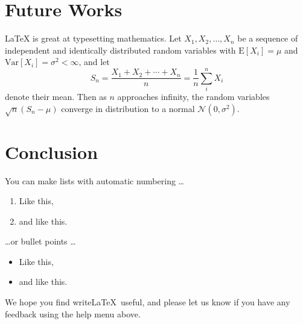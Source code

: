 
\section{Future Works}

\LaTeX{} is great at typesetting mathematics. Let $X_1, X_2, \ldots, X_n$ be a sequence of independent and identically distributed random variables with $\text{E}[X_i] = \mu$ and $\text{Var}[X_i] = \sigma^2 < \infty$, and let
$$S_n = \frac{X_1 + X_2 + \cdots + X_n}{n}
      = \frac{1}{n}\sum_{i}^{n} X_i$$
denote their mean. Then as $n$ approaches infinity, the random variables $\sqrt{n}(S_n - \mu)$ converge in distribution to a normal $\mathcal{N}(0, \sigma^2)$.

\section{Conclusion}

You can make lists with automatic numbering \dots

\begin{enumerate}
\item Like this,
\item and like this.
\end{enumerate}
\dots or bullet points \dots
\begin{itemize}
\item Like this,
\item and like this.
\end{itemize}

We hope you find write\LaTeX\ useful, and please let us know if you have any feedback using the help menu above.




